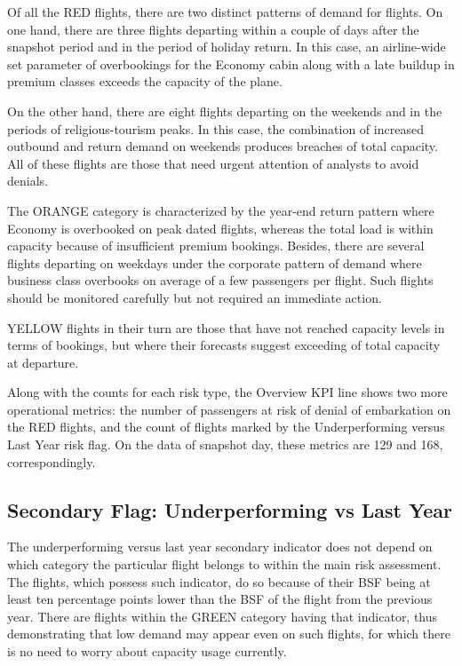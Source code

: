 Of all the RED flights, there are two distinct patterns of demand for flights. On one hand, there are three flights departing within a couple of days after the snapshot period and in the period of holiday return. In this case, an airline-wide set parameter of overbookings for the Economy cabin along with a late buildup in premium classes exceeds the capacity of the plane.

On the other hand, there are eight flights departing on the weekends and in the periods of religious-tourism peaks. In this case, the combination of increased outbound and return demand on weekends produces breaches of total capacity. All of these flights are those that need urgent attention of analysts to avoid denials.

The ORANGE category is characterized by the year-end return pattern where Economy is overbooked on peak dated flights, whereas the total load is within capacity because of insufficient premium bookings. Besides, there are several flights departing on weekdays under the corporate pattern of demand where business class overbooks on average of a few passengers per flight. Such flights should be monitored carefully but not required an immediate action.

YELLOW flights in their turn are those that have not reached capacity levels in terms of bookings, but where their forecasts suggest exceeding of total capacity at departure.

Along with the counts for each risk type, the Overview KPI line shows two more operational metrics: the number of passengers at risk of denial of embarkation on the RED flights, and the count of flights marked by the Underperforming versus Last Year risk flag. On the data of snapshot day, these metrics are 129 and 168, correspondingly.

\subsection{Secondary Flag: Underperforming vs Last Year}

The underperforming versus last year secondary indicator does not depend on which category the particular flight belongs to within the main risk assessment. The flights, which possess such indicator, do so because of their BSF being at least ten percentage points lower than the BSF of the flight from the previous year. There are flights within the GREEN category having that indicator, thus demonstrating that low demand may appear even on such flights, for which there is no need to worry about capacity usage currently.

